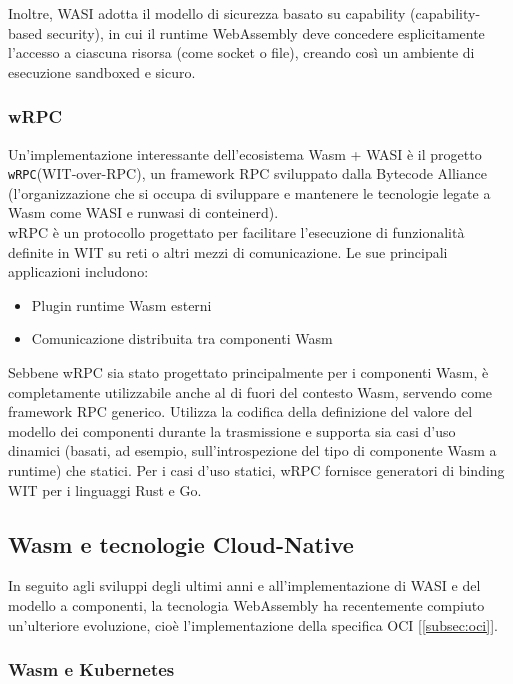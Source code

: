 Inoltre, WASI adotta il modello di sicurezza basato su capability\cite{Sangeeta23} (capability-based security), in cui il runtime WebAssembly deve concedere esplicitamente l'accesso a ciascuna risorsa (come socket o file), creando così un ambiente di esecuzione sandboxed e sicuro.\\

\subsubsection{wRPC}
\label{sec:wrpc}

Un'implementazione interessante dell'ecosistema Wasm + WASI è il progetto \texttt{wRPC}\cite{bytecodealliance_wrpc}(WIT-over-RPC), un framework RPC sviluppato dalla Bytecode Alliance (l'organizzazione che si occupa di sviluppare e mantenere le tecnologie legate a Wasm come WASI\cite{WASI2024} e runwasi\cite{containerd_runwasi} di conteinerd).\\
wRPC è un protocollo progettato per facilitare l'esecuzione di funzionalità definite in WIT su reti o altri mezzi di comunicazione. Le sue principali applicazioni includono:
\begin{itemize}
    \item Plugin runtime Wasm esterni
    \item Comunicazione distribuita tra componenti Wasm
\end{itemize}
Sebbene wRPC sia stato progettato principalmente per i componenti Wasm, è completamente utilizzabile anche al di fuori del contesto Wasm, servendo come framework RPC generico. Utilizza la codifica della definizione del valore del modello dei componenti durante la trasmissione e supporta sia casi d'uso dinamici (basati, ad esempio, sull'introspezione del tipo di componente Wasm a runtime) che statici. Per i casi d'uso statici, wRPC fornisce generatori di binding WIT per i linguaggi Rust e Go.\\

\subsection{Wasm e tecnologie Cloud-Native}

In seguito agli sviluppi degli ultimi anni e all'implementazione di WASI e del modello a componenti, la tecnologia WebAssembly ha recentemente compiuto un'ulteriore evoluzione, cioè l'implementazione della specifica OCI [\ref{subsec:oci}].\\

\subsubsection{Wasm e Kubernetes}

